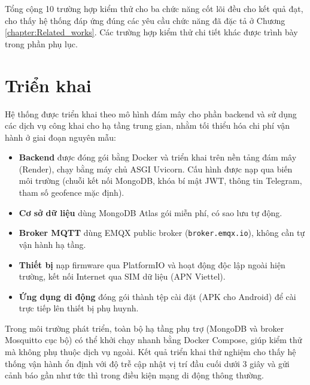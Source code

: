 \documentclass[../DoAn.tex]{subfiles}
\begin{document}
    Tổng cộng 10 trường hợp kiểm thử cho ba chức năng cốt lõi đều cho kết quả đạt, cho thấy hệ thống đáp ứng đúng các yêu cầu chức năng đã đặc tả ở Chương \ref{chapter:Related_works}. Các trường hợp kiểm thử chi tiết khác được trình bày trong phần phụ lục.

    \section{Triển khai}

    Hệ thống được triển khai theo mô hình đám mây cho phần backend và sử dụng các dịch vụ công khai cho hạ tầng trung gian, nhằm tối thiểu hóa chi phí vận hành ở giai đoạn nguyên mẫu:

    \begin{itemize}
        \item \textbf{Backend} được đóng gói bằng Docker và triển khai trên nền tảng đám mây (Render), chạy bằng máy chủ ASGI Uvicorn. Cấu hình được nạp qua biến môi trường (chuỗi kết nối MongoDB, khóa bí mật JWT, thông tin Telegram, tham số geofence mặc định).
        \item \textbf{Cơ sở dữ liệu} dùng MongoDB Atlas gói miễn phí, có sao lưu tự động.
        \item \textbf{Broker MQTT} dùng EMQX public broker (\texttt{broker.emqx.io}), không cần tự vận hành hạ tầng.
        \item \textbf{Thiết bị} nạp firmware qua PlatformIO và hoạt động độc lập ngoài hiện trường, kết nối Internet qua SIM dữ liệu (APN Viettel).
        \item \textbf{Ứng dụng di động} đóng gói thành tệp cài đặt (APK cho Android) để cài trực tiếp lên thiết bị phụ huynh.
    \end{itemize}

    Trong môi trường phát triển, toàn bộ hạ tầng phụ trợ (MongoDB và broker Mosquitto cục bộ) có thể khởi chạy nhanh bằng Docker Compose, giúp kiểm thử mà không phụ thuộc dịch vụ ngoài. Kết quả triển khai thử nghiệm cho thấy hệ thống vận hành ổn định với độ trễ cập nhật vị trí đầu cuối dưới 3 giây và gửi cảnh báo gần như tức thì trong điều kiện mạng di động thông thường.

    
\end{document}
